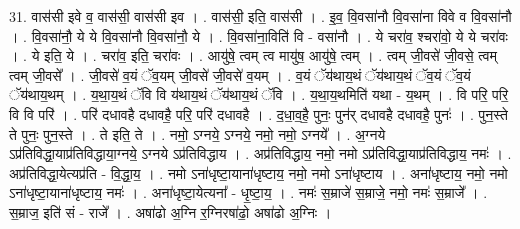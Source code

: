 \documentclass[17pt]{extarticle}
\begin{document}
31. वास॑सी इवे व॒ वास॑सी॒ वास॑सी इव । . वास॑सी॒ इति॒ वास॑सी । . इ॒व॒ वि॒वसा॑नौ वि॒वसा॑ना विवे व वि॒वसा॑नौ । . वि॒वसा॑नौ॒ ये ये वि॒वसा॑नौ वि॒वसा॑नौ॒ ये । . वि॒वसा॑ना॒विति॑ वि - वसा॑नौ । . ये चरा॑व॒ श्चरा॑वो॒ ये ये चरा॑वः । . ये इति॒ ये । . चरा॑व॒ इति॒ चरा॑वः । . आयु॑षे॒ त्वम् त्व मायु॑ष॒ आयु॑षे॒ त्वम् । . त्वम् जी॒वसे॑ जी॒वसे॒ त्वम् त्वम् जी॒वसे᳚ । . जी॒वसे॑ व॒यं ॅव॒यम् जी॒वसे॑ जी॒वसे॑ व॒यम् । . व॒यं ॅय॑थाय॒थं ॅय॑थाय॒थं ॅव॒यं ॅव॒यं ॅय॑थाय॒थम् । . य॒था॒य॒थं ॅवि वि य॑थाय॒थं ॅय॑थाय॒थं ॅवि । . य॒था॒य॒थमिति॑ यथा - य॒थम् । . वि परि॒ परि॒ वि वि परि॑ । . परि॑ दधावहै दधावहै॒ परि॒ परि॑ दधावहै । . द॒धा॒व॒है॒ पुनः॒ पुन॑र् दधावहै दधावहै॒ पुनः॑ । . पुन॒स्ते ते पुनः॒ पुन॒स्ते । . ते इति॒ ते । . नमो॒ ऽग्नये॒ ऽग्नये॒ नमो॒ नमो॒ ऽग्नये᳚ । . अ॒ग्नये ऽप्र॑तिविद्धा॒याप्र॑तिविद्धाया॒ग्नये॒ ऽग्नये ऽप्र॑तिविद्धाय । . अप्र॑तिविद्धाय॒ नमो॒ नमो ऽप्र॑तिविद्धा॒याप्र॑तिविद्धाय॒ नमः॑ । . अप्र॑तिविद्धा॒येत्यप्र॑ति - वि॒द्धा॒य॒ । . नमो ऽना॑धृष्टा॒याना॑धृष्टाय॒ नमो॒ नमो ऽना॑धृष्टाय । . अना॑धृष्टाय॒ नमो॒ नमो ऽना॑धृष्टा॒याना॑धृष्टाय॒ नमः॑ । . अना॑धृष्टा॒येत्यना᳚ - धृ॒ष्टा॒य॒ । . नमः॑ स॒म्राजे॑ स॒म्राजे॒ नमो॒ नमः॑ स॒म्राजे᳚ । . स॒म्राज॒ इति॑ सं - राजे᳚ । . अषा॑ढो अ॒ग्नि र॒ग्निरषा॑ढो॒ अषा॑ढो अ॒ग्निः । \newline
\end{document}
